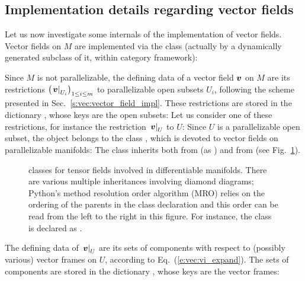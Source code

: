 \subsection{Implementation details regarding vector fields}

Let us now investigate some internals of the implementation of vector fields.
Vector fields on $M$ are implemented via the class
 (actually by a dynamically generated subclass of it, within \Sage{} category
framework):

Since $M$ is not parallelizable, the defining data of a
vector field $\bm{v}$ on $M$ are its restrictions
$\left(\left. \bm{v}\right| _{U_i}\right)_{1\leq i \leq m}$
to parallelizable open subsets $U_i$,
following the scheme presented in Sec.~\ref{s:vec:vector_field_impl}.
These restrictions are stored in the dictionary , whose keys are
the open subsets:
Let us consider one of these restrictions, for instance the restriction
$\left. \bm{v}\right| _U$ to $U$:
Since $U$ is a parallelizable open subset, the object  belongs
to the class , which is devoted to vector fields
on parallelizable manifolds:
The class  inherits both from
 (as ) and from
 (see Fig.~\ref{f:vec:tensorfield_classes}).
\begin{figure}
\begin{center}

\end{center}
\caption{\label{f:vec:tensorfield_classes}\footnotesize
\Sage{} classes for tensor fields involved in differentiable manifolds.
There are various multiple inheritances involving diamond diagrams;
Python's method resolution order algorithm (MRO) relies on the ordering of the parents
in the class declaration and this order can be read from the left to the right in
this figure. For instance, the class  is declared as
.}
\end{figure}
The defining data of $\left. \bm{v}\right| _U$ are
its sets of components with respect to (possibly various)
vector frames on $U$, according to Eq.~(\ref{e:vec:vi_expand}). The sets of components are stored in the dictionary , whose keys are the vector frames:
